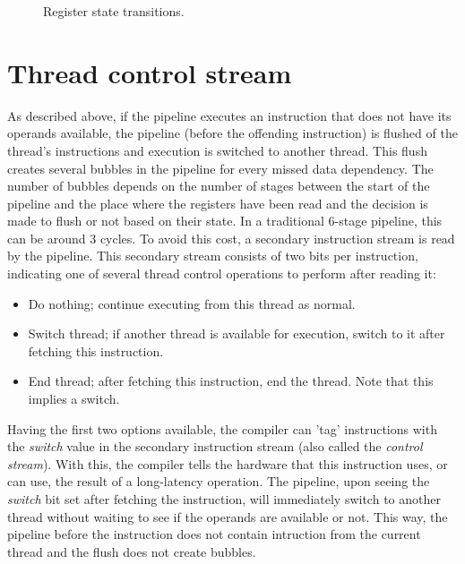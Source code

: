 \begin{figure}
 \begin{center}
  
  \caption{Register state transitions.}
  \label{fig:register-states}
 \end{center}
\end{figure}

\section{\label{sec:control-stream}Thread control stream}
As described above, if the pipeline executes an instruction that does not have its operands available, the pipeline (before the offending instruction) is flushed of the thread's instructions and execution is switched to another thread. This flush creates several bubbles in the pipeline for every missed data dependency. The number of bubbles depends on the number of stages between the start of the pipeline and the place where the registers have been read and the decision is made to flush or not based on their state. In a traditional 6-stage pipeline, this can be around 3 cycles. To avoid this cost, a secondary instruction stream is read by the pipeline. This secondary stream consists of two bits per instruction, indicating one of several thread control operations to perform after reading it:

\begin{itemize}
\item Do nothing; continue executing from this thread as normal.
\item Switch thread; if another thread is available for execution, switch to it after fetching this instruction.
\item End thread; after fetching this instruction, end the thread. Note that this implies a switch.
\end{itemize}

Having the first two options available, the compiler can 'tag' instructions with the \emph{switch} value in the secondary instruction stream (also called the \emph{control stream}). With this, the compiler tells the hardware that this instruction uses, or can use, the result of a long-latency operation. The pipeline, upon seeing the \emph{switch} bit set after fetching the instruction, will immediately switch to another thread without waiting to see if the operands are available or not. This way, the pipeline before the instruction does not contain intruction from the current thread and the flush does not create bubbles.

